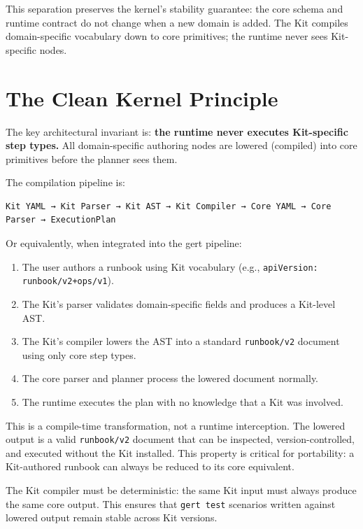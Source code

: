 This separation preserves the kernel's stability guarantee: the core schema and
runtime contract do not change when a new domain is added.  The Kit compiles
domain-specific vocabulary down to core primitives; the runtime never sees
Kit-specific nodes.

\section{The Clean Kernel Principle}
\label{sec:kit-clean-kernel}

The key architectural invariant is: \textbf{the runtime never executes
Kit-specific step types.}  All domain-specific authoring nodes are lowered
(compiled) into core primitives before the planner sees them.

The compilation pipeline is:

\begin{verbatim}
Kit YAML → Kit Parser → Kit AST → Kit Compiler → Core YAML → Core Parser → ExecutionPlan
\end{verbatim}

Or equivalently, when integrated into the gert pipeline:

\begin{enumerate}
  \item The user authors a runbook using Kit vocabulary (e.g.,
    \texttt{apiVersion: runbook/v2+ops/v1}).
  \item The Kit's parser validates domain-specific fields and produces a
    Kit-level AST.
  \item The Kit's compiler lowers the AST into a standard \texttt{runbook/v2}
    document using only core step types.
  \item The core parser and planner process the lowered document normally.
  \item The runtime executes the plan with no knowledge that a Kit was
    involved.
\end{enumerate}

This is a compile-time transformation, not a runtime interception.  The lowered
output is a valid \texttt{runbook/v2} document that can be inspected,
version-controlled, and executed without the Kit installed.  This property is
critical for portability: a Kit-authored runbook can always be reduced to its
core equivalent.

The Kit compiler must be deterministic: the same Kit input must always produce
the same core output.  This ensures that \texttt{gert test} scenarios written
against lowered output remain stable across Kit versions.

